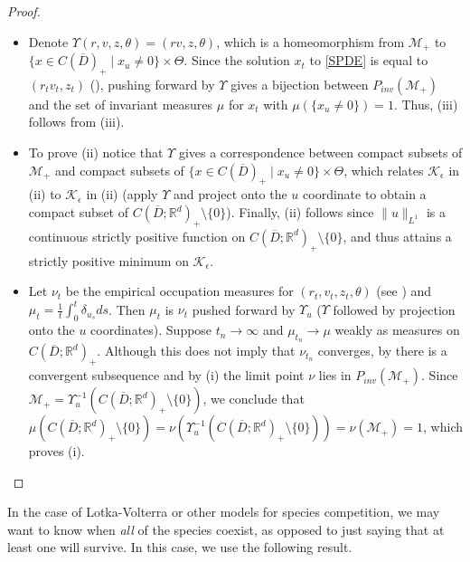 \documentclass[final]{amsart}
\numberwithin{thm}{section}
\numberwithin{equation}{section}
\newcommand{\R}{\mathbb{R}}
\newcommand{\inv}{\mathcal{M}_+}
\newcommand{\K}{\mathcal{K}}
\newcommand{\cdom}{C(\overline D)_+}
\begin{document}
\begin{proof}
\begin{itemize}
    \item Denote $\Upsilon(r,v,z,\theta) = (rv,z,\theta)$, which is a homeomorphism from $\inv$ to $\{x \in \cdom \mid x_u \neq 0\} \times \Theta$. Since the solution $x_t$ to \eqref{SPDE} is equal to $(r_tv_t,z_t)$ (), pushing forward by $\Upsilon$ gives a bijection between $P_{inv}(\inv)$ and the set of invariant measures $\mu$ for $x_t$ with $\mu(\{x_u \neq 0\}) = 1$. Thus, (iii) follows from  (iii).
    \item To prove (ii) notice that $\Upsilon$ gives a correspondence between compact subsets of $\inv$ and compact subsets of $\{x \in \cdom \mid x_u \neq 0\} \times \Theta$, which relates 
$\K_\epsilon$ in (ii) to  $\K_\epsilon$ in (ii)
    (apply $\Upsilon$ and project onto the $u$ coordinate to obtain a compact subset of $C(\overline D;\R^d)_+ \setminus \{0\}$). Finally, (ii) follows since $\|u\|_{L^1}$ is a continuous strictly positive function on $C(\overline D;\R^d)_+ \setminus \{0\}$, and thus attains a strictly positive minimum on $\K_\epsilon$. 
    \item Let $\nu_t$ be the empirical occupation measures for $(r_t,v_t,z_t,\theta)$ (see ) and $\mu_t = \frac{1}{t}\int_0^t \delta_{u_s}ds$. Then $\mu_t$ is $\nu_t$ pushed forward by $\Upsilon_u$ ($\Upsilon$ followed by projection onto the $u$ coordinates). Suppose $t_n \to \infty$ and $\mu_{t_n} \to \mu$ weakly as measures on $C(\overline D;\R^d)_+$. Although this does not imply that $\nu_{t_n}$ converges, by  there is a convergent subsequence and by (i) the limit point $\nu$ lies in $P_{inv}(\inv)$. Since $\inv = \Upsilon_u^{-1}(C(\overline D;\R^d)_+ \setminus \{0\})$, we conclude that $\mu(C(\overline D;\R^d)_+ \setminus \{0\}) = \nu(\Upsilon_u^{-1}(C(\overline D;\R^d)_+ \setminus \{0\})) = \nu(\inv) = 1$, which proves (i).
    \end{itemize}
\end{proof}


In the case of Lotka-Volterra or other models for species competition, we may want to know when \textit{all} of the species coexist, as opposed to just saying that at least one will survive. In this case, we use the following result.
\end{document}
